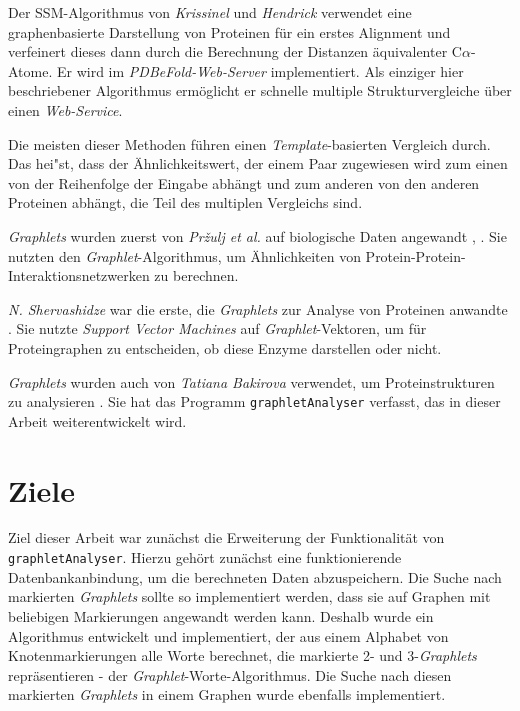 \documentclass{report}
\begin{document}
Der SSM-Algorithmus von \textit{Krissinel} und \textit{Hendrick} \cite{pdbefold} verwendet eine graphenbasierte Darstellung von Proteinen f\"ur ein erstes Alignment und verfeinert dieses dann durch die Berechnung der Distanzen \"aquivalenter C$\alpha$-Atome. Er wird im \textit{PDBeFold-Web-Server} implementiert. Als einziger hier beschriebener Algorithmus erm\"oglicht er schnelle multiple Strukturvergleiche \"uber einen \textit{Web-Service}.


Die meisten dieser Methoden f\"uhren einen \textit{Template}-basierten Vergleich durch. Das hei"st, dass der \"Ahnlichkeitswert, der einem Paar zugewiesen wird zum einen von der Reihenfolge der Eingabe abh\"angt und zum anderen von den anderen Proteinen abh\"angt, die Teil des multiplen Vergleichs sind.


\textit{Graphlets} wurden zuerst von \textit{Pr{\v z}ulj et al.} auf biologische Daten angewandt \cite{frqdistribution}, \cite{graphletfrequency}. Sie nutzten den \textit{Graphlet}-Algorithmus, um \"Ahnlichkeiten von Protein-Protein-Interaktionsnetzwerken zu berechnen.

\textit{N. Shervashidze} war die erste, die \textit{Graphlets} zur Analyse von Proteinen anwandte \cite{sherv_graphlets}. Sie nutzte \textit{Support Vector Machines} auf \textit{Graphlet}-Vektoren, um  f\"ur Proteingraphen zu entscheiden, ob diese Enzyme darstellen oder nicht.

\textit{Graphlets} wurden auch von \textit{Tatiana Bakirova} verwendet, um Proteinstrukturen zu analysieren \cite{bakirova2013comparison}. Sie hat das Programm \texttt{graphletAnalyser} verfasst, das in dieser Arbeit weiterentwickelt wird.

\section{Ziele}

Ziel dieser Arbeit war zun\"achst die Erweiterung der Funktionalit\"at von \\ \texttt{graphletAnalyser}. Hierzu geh\"ort zun\"achst eine funktionierende Datenbankanbindung, um die berechneten Daten abzuspeichern.
Die Suche nach markierten \textit{Graphlets} sollte so implementiert werden, dass sie auf Graphen mit beliebigen Markierungen angewandt werden kann. Deshalb wurde ein Algorithmus entwickelt und implementiert, der aus einem Alphabet von Knotenmarkierungen alle Worte berechnet, die markierte  2- und 3-\textit{Graphlets} repr\"asentieren - der \textit{Graphlet}-Worte-Algorithmus. Die Suche nach diesen markierten \textit{Graphlets} in einem Graphen wurde ebenfalls implementiert.
\end{document}
